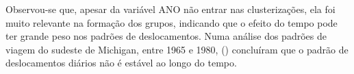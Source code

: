 Observou-se que, apesar da variável ANO não entrar nas clusterizações, ela foi muito relevante na formação dos grupos, indicando que o efeito do tempo pode ter grande peso nos padrões de deslocamentos.
Numa análise dos padrões de viagem do sudeste de Michigan, entre 1965 e 1980,  (\citeyear{KITAMURA1994}) concluíram que o padrão de deslocamentos diários não é estável ao longo do tempo.

